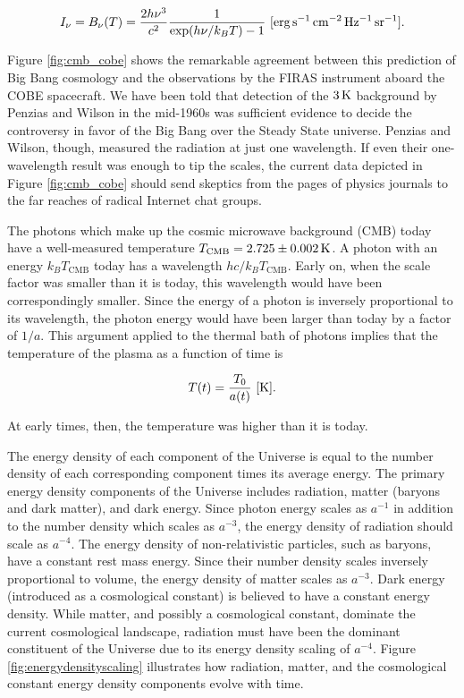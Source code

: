 \documentclass[a4paper,11pt]{article}
\begin{document}
\begin{align*}
    I_\nu = B_\nu(T) = \frac{2h\nu^3}{c^2} \frac{1}{\exp({h\nu/k_BT}) - 1} ~ [{\rm erg\,s^{-1}\,cm^{-2}\,Hz^{-1}\,sr^{-1}}].
\end{align*}

{\noindent}Figure \ref{fig:cmb_cobe} shows the remarkable agreement between this prediction of Big Bang cosmology and the observations by the FIRAS instrument aboard the COBE spacecraft. We have been told that detection of the $3\,{\rm K}$ background by Penzias and Wilson in the mid-1960s was sufficient evidence to decide the controversy in favor of the Big Bang over the Steady State universe. Penzias and Wilson, though, measured the radiation at just one wavelength. If even their one-wavelength result was enough to tip the scales, the current data depicted in Figure \ref{fig:cmb_cobe} should send skeptics from the pages of physics journals to the far reaches of radical Internet chat groups.

{\noindent}The photons which make up the cosmic microwave background (CMB) today have a well-measured temperature $T_\mathrm{CMB} = 2.725 \pm 0.002\,{\rm K}$. A photon with an energy $k_BT_\mathrm{CMB}$ today has a wavelength $hc/k_BT_\mathrm{CMB}$. Early on, when the scale factor was smaller than it is today, this wavelength would have been correspondingly smaller. Since the energy of a photon is inversely proportional to its wavelength, the photon energy would have been larger than today by a factor of $1/a$. This argument applied to the thermal bath of photons implies that the temperature of the plasma as a function of time is

\begin{align*}
    T(t) = \frac{T_0}{a(t)} ~ [{\rm K}].
\end{align*}

{\noindent}At early times, then, the temperature was higher than it is today.

{\noindent}The energy density of each component of the Universe is equal to the number density of each corresponding component times its average energy. The primary energy density components of the Universe includes radiation, matter (baryons and dark matter), and dark energy. Since photon energy scales as $a^{-1}$ in addition to the number density which scales as $a^{-3}$, the energy density of radiation should scale as $a^{-4}$. The energy density of non-relativistic particles, such as baryons, have a constant rest mass energy. Since their number density scales inversely proportional to volume, the energy density of matter scales as $a^{-3}$. Dark energy (introduced as a cosmological constant) is believed to have a constant energy density. While matter, and possibly a cosmological constant, dominate the current cosmological landscape, radiation must have been the dominant constituent of the Universe due to its energy density scaling of $a^{-4}$. Figure \ref{fig:energydensityscaling} illustrates how radiation, matter, and the cosmological constant energy density components evolve with time.
\end{document}
